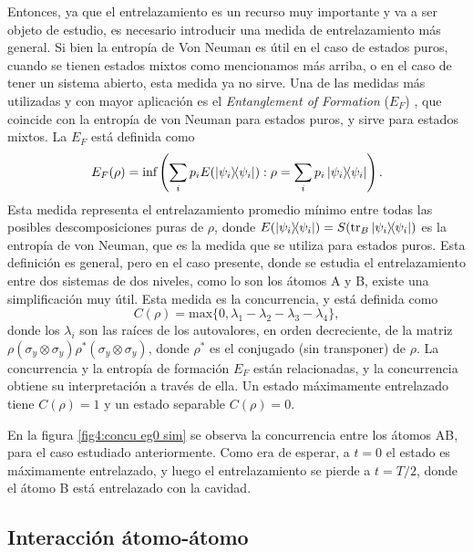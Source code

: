 Entonces, ya que el entrelazamiento es un recurso muy importante y va a ser objeto de estudio, es necesario introducir una medida de entrelazamiento más general. Si bien la entropía de Von Neuman es útil en el caso de estados puros, cuando se tienen estados mixtos como mencionamos más arriba, o en el caso de tener un sistema abierto, esta medida ya no sirve. Una de las medidas más utilizadas y con mayor aplicación es el \textit{Entanglement of Formation} ($E_F$) \cite{Plenio2006}, que coincide con la entropía de von Neuman para estados puros, y sirve para estados mixtos. La $E_F$ está definida como
\begin{equation}
    E_F(\rho)=\text{inf}\left( \sum_i p_i E(\ketbra{\psi_i}{\psi_i}) : \rho = \sum_i p_i\ketbra{\psi_i}{\psi_i}\right).
    \label{ec4:entanglement}
\end{equation}
Esta medida representa el entrelazamiento promedio mínimo entre todas las posibles descomposiciones puras de $\rho$, donde $E(\ketbra{\psi_i}{\psi_i})=S(\tr_B{\ketbra{\psi_i}{\psi_i}})$ es la entropía de von Neuman, que es la medida que se utiliza para estados puros. Esta definición es general, pero en el caso presente, donde se estudia el entrelazamiento entre dos sistemas de dos niveles, como lo son los átomos A y B, existe una simplificación muy útil. Esta medida es la concurrencia, y está definida como
\begin{equation}
    C(\rho)=\text{max}\{0,\lambda_1-\lambda_2-\lambda_3-\lambda_4\},
    \label{ec4:concurrencia}
\end{equation}
donde los $\lambda_i$ son las raíces de los autovalores, en orden decreciente, de la matriz \newline $\rho(\sigma_y\otimes\sigma_y)\rho^*(\sigma_y\otimes\sigma_y)$, donde $\rho^*$ es el conjugado (sin transponer) de $\rho$. La concurrencia y la entropía de formación $E_F$ están relacionadas, y la concurrencia obtiene su interpretación a través de ella. Un estado máximamente entrelazado tiene $C(\rho)=1$ y un estado separable $C(\rho)=0$. 


En la figura \ref{fig4:concu eg0 sim} se observa la concurrencia entre los átomos AB, para el caso estudiado anteriormente. Como era de esperar, a $t=0$ el estado es máximamente entrelazado, y luego el entrelazamiento se pierde a $t=T/2$, donde el átomo B está entrelazado con la cavidad. 

\subsection{Interacción átomo-átomo}

